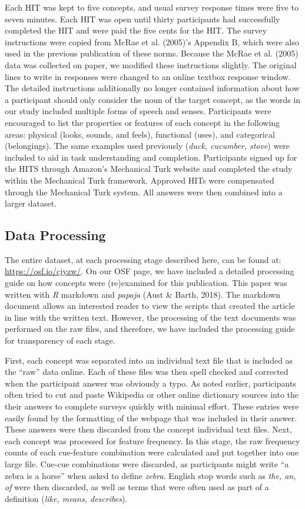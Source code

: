 \documentclass[english,man]{apa6}
\theoremstyle{definition}
\theoremstyle{definition}
\theoremstyle{definition}
\theoremstyle{remark}
\begin{document}
Each HIT was kept to five concepts, and usual survey response times were
five to seven minutes. Each HIT was open until thirty participants had
successfully completed the HIT and were paid the five cents for the HIT.
The survey instructions were copied from McRae et al. (2005)'s Appendix
B, which were also used in the previous publication of these norms.
Because the McRae et al. (2005) data was collected on paper, we modified
these instructions slightly. The original lines to write in responses
were changed to an online textbox response window. The detailed
instructions additionally no longer contained information about how a
participant should only consider the noun of the target concept, as the
words in our study included multiple forms of speech and senses.
Participants were encouraged to list the properties or features of each
concept in the following areas: physical (looks, sounds, and feels),
functional (uses), and categorical (belongings). The same examples used
previously (\emph{duck, cucumber, stove}) were included to aid in task
understanding and completion. Participants signed up for the HITS
through Amazon's Mechanical Turk website and completed the study within
the Mechanical Turk framework. Approved HITs were compensated through
the Mechanical Turk system. All answers were then combined into a larger
dataset.

\subsection{Data Processing}\label{data-processing}

The entire dataset, at each processing stage described here, can be
found at: \url{https://osf.io/cjyzw/}. On our OSF page, we have included
a detailed processing guide on how concepts were (re)examined for this
publication. This paper was written with \emph{R} markdown and
\emph{papaja} (Aust \& Barth, 2018). The markdown document allows an
interested reader to view the scripts that created the article in line
with the written text. However, the processing of the text documents was
performed on the raw files, and therefore, we have included the
processing guide for transparency of each stage.

First, each concept was separated into an individual text file that is
included as the \enquote{raw} data online. Each of these files was then
spell checked and corrected when the participant answer was obviously a
typo. As noted earlier, participants often tried to cut and paste
Wikipedia or other online dictionary sources into the their answers to
complete surveys quickly with minimal effort. These entries were easily
found by the formatting of the webpage that was included in their
answer. These answers were then discarded from the concept individual
text files. Next, each concept was processed for feature frequency. In
this stage, the raw frequency counts of each cue-feature combination
were calculated and put together into one large file. Cue-cue
combinations were discarded, as participants might write \enquote{a
zebra is a horse} when asked to define \emph{zebra}. English stop words
such as \emph{the, an, of} were then discarded, as well as terms that
were often used as part of a definition (\emph{like, means, describes}).
\end{document}
